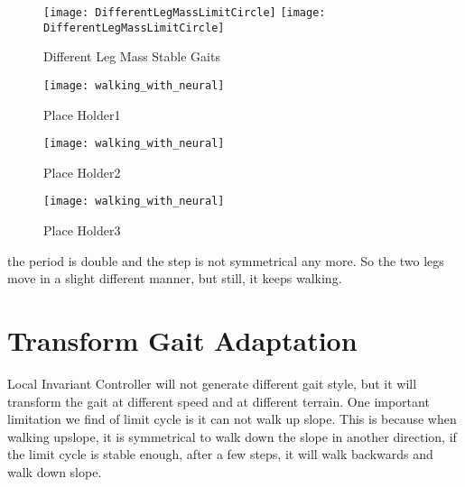 \begin{figure}[!htbp]
  \begin{center}
    \leavevmode
    \ifpdf
      \texttt{[image: DifferentLegMassLimitCircle]}
    \else
      \texttt{[image: DifferentLegMassLimitCircle]}
    \fi
    \caption{Different Leg Mass Stable Gaits}
    \label{fig:differentlr}
\end{center}
\end{figure}


\begin{figure}[!htbp]
  \begin{center}
      \texttt{[image: walking\_with\_neural]}
    \caption{Place Holder1}
    \label{fig:lm1}
\end{center}
\end{figure}

\begin{figure}[!htbp]
  \begin{center}
      \texttt{[image: walking\_with\_neural]}
    \caption{Place Holder2}
    \label{fig:lm2}
\end{center}
\end{figure}

\begin{figure}[!htbp]
  \begin{center}
      \texttt{[image: walking\_with\_neural]}
    \caption{Place Holder3}
    \label{fig:lm3}
\end{center}
\end{figure}





the period is double and the step is not symmetrical any more. So the two legs move in a slight different manner, but still, it keeps walking.

\section{Transform Gait Adaptation}
Local Invariant Controller will not generate different gait style, but it will transform the gait at different speed and at different terrain.
One important limitation we find of limit cycle is it can not walk up slope.
This is because when walking upslope, it is symmetrical to walk down the slope in another direction, if the limit cycle is stable enough, after a few steps, it will walk backwards and walk down slope.



